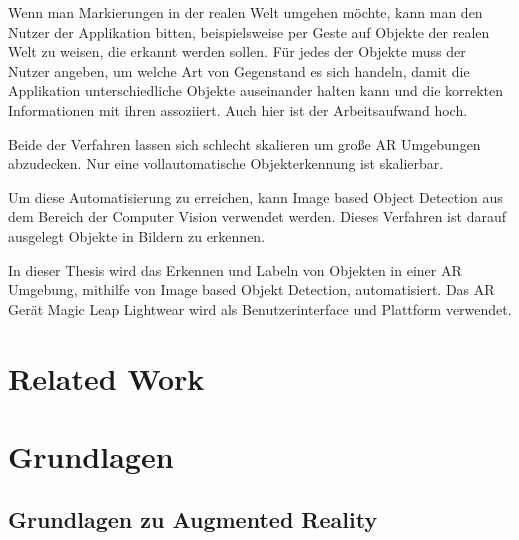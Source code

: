 \documentclass[german,a4paper, 12pt]{llncs}
\begin{document}
Wenn man Markierungen in der realen Welt umgehen möchte, kann man den Nutzer der Applikation bitten, beispielsweise per Geste auf Objekte der realen Welt zu weisen, die erkannt werden sollen. Für jedes der Objekte muss der Nutzer angeben, um welche Art von Gegenstand es sich handeln, damit die Applikation unterschiedliche Objekte auseinander halten kann und die korrekten Informationen mit ihren assoziiert. Auch hier ist der Arbeitsaufwand hoch.

Beide der Verfahren lassen sich schlecht skalieren um große AR Umgebungen abzudecken. Nur eine vollautomatische Objekterkennung ist skalierbar. 

Um diese Automatisierung zu erreichen, kann Image based Object Detection aus dem Bereich der Computer Vision verwendet werden.
Dieses Verfahren ist darauf ausgelegt Objekte in Bildern zu erkennen.\cite{introToCNN}

In dieser Thesis wird das Erkennen und Labeln von Objekten in einer AR Umgebung, mithilfe von Image based Objekt Detection, automatisiert. 
Das AR Gerät Magic Leap Lightwear wird als Benutzerinterface und Plattform verwendet.



\section{Related Work}


\section{Grundlagen}



\subsection{Grundlagen zu Augmented Reality}
\end{document}
